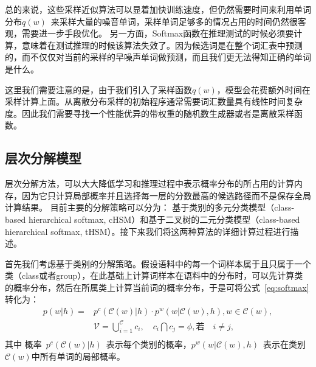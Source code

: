 总的来说，这些采样近似算法可以显着加快训练速度，但仍然需要时间来利用单词分布$q(w)$~来采样大量的噪音单词，采样单词足够多的情况占用的时间仍然很客观，需要进一步手段优化。 另一方面，Softmax函数在推理测试的时候必须要计算，意味着在测试推理的时候该算法失效了。因为候选词是在整个词汇表中预测的，而不仅仅对当前的采样的早噪声单词做预测，而且我们更无法得知正确的单词是什么。

这里我们需要注意的是，由于我们引入了采样函数$q(w)$，模型会花费额外时间在采样计算上面。从离散分布采样的初始程序通常需要词汇数量具有线性时间复杂度。因此我们需要寻找一个性能优异的带权重的随机数生成器或者是离散采样函数。


\subsection{层次分解模型}
层次分解方法，可以大大降低学习和推理过程中表示概率分布的所占用的计算内存，因为它只计算局部概率并且选择每一层的分数最高的候选路径而不是保存全局计算结果。
目前主要的分解策略可以分为： 基于类别的多元分类模型（class-based hierarchical softmax, cHSM）和基于二叉树的二元分类模型（class-based hierarchical softmax, tHSM）。接下来我们将这两种算法的详细计算过程进行描述。

首先我们考虑基于类别的分解策略。假设语料中的每一个词样本属于且只属于一个类（class或者group），在此基础上计算词样本在语料中的分布时，可以先计算类的概率分布，然后在所属类上计算当前词的概率分布，于是可将公式~\ref{eq:softmax} 转化为：
  \begin{equation}
  \begin{split}
p(w|h)=&p^c(\mathcal{C}(w)|h)\cdot p^w(w|\mathcal{C}(w),h) , w\in \mathcal{C}(w),\\
&\mathcal{V}=\bigcup _{i = 1}^\mathcal{C}{c_i},\quad  c_i \bigcap c_j=\phi, \text{若}\quad i\ne j, \\
\end{split}
\end{equation}
其中 概率~$p^c(\mathcal{C}(w)|h)$~表示每个类别的概率，$p^w(w|\mathcal{C}(w),h)$~表示在类别$\mathcal{C}(w)$中所有单词的局部概率。

